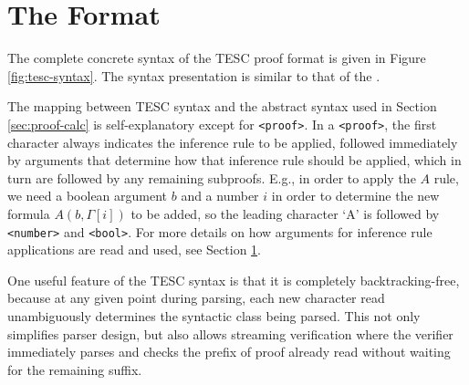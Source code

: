 \documentclass[12pt]{article}
\begin{document}
\section{The Format} \label{sec:format}

The complete concrete syntax of the TESC proof format is given in Figure \ref{fig:tesc-syntax}. The syntax presentation is similar to 
that of the \href{http://www.tptp.org/TPTP/SyntaxBNF.html}{\color{blue}{TPTP syntax}}. 

The mapping between TESC syntax and the abstract syntax used in Section \ref{sec:proof-calc} is self-explanatory except for \texttt{<proof>}. 
In a \texttt{<proof>}, the first character always indicates the inference rule to be applied, followed immediately by arguments that determine 
how that inference rule should be applied, which in turn are followed by any remaining subproofs. E.g., in order to apply the $A$ rule, we need a 
boolean argument $b$ and a number $i$ in order to determine the new formula $A(b, \Gamma[i])$ to be added, so the leading character `A' is followed
by \texttt{<number>} and \texttt{<bool>}. For more details on how arguments for inference rule applications are read and used, see Section 
\ref{sec:format}.

One useful feature of the TESC syntax is that it is completely backtracking-free, because at any given point during parsing, each new 
character read unambiguously determines the syntactic class being parsed. This not only simplifies parser design, but also allows 
streaming verification where the verifier immediately parses and checks the prefix of proof already read without waiting for the 
remaining suffix.
\end{document}
